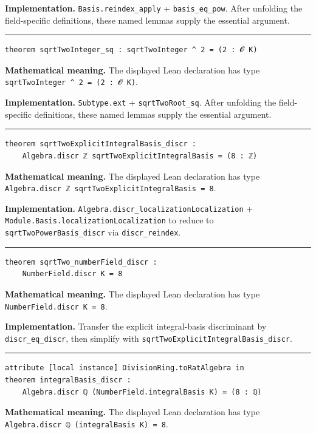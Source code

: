 \documentclass[UTF8,a4paper,11pt,fontset=fandol]{ctexart}
\theoremstyle{definition}
\newcommand{\statementsep}{\par\medskip\hrule\medskip}
\begin{document}
\noindent\textbf{Implementation.} \texttt{Basis.\allowbreak{}reindex\_\allowbreak{}apply} + \texttt{basis\_\allowbreak{}eq\_\allowbreak{}pow}. After unfolding the field-specific definitions, these named lemmas supply the essential argument.\par
\statementsep
\begin{verbatim}
theorem sqrtTwoInteger_sq : sqrtTwoInteger ^ 2 = (2 : 𝓞 K)
\end{verbatim}
\noindent\textbf{Mathematical meaning.} The displayed Lean declaration has type \texttt{sqrtTwoInteger \textasciicircum{} 2 = (2 : 𝓞 K)}.\par
\noindent\textbf{Implementation.} \texttt{Subtype.\allowbreak{}ext} + \texttt{sqrtTwoRoot\_\allowbreak{}sq}. After unfolding the field-specific definitions, these named lemmas supply the essential argument.\par
\statementsep
\begin{verbatim}
theorem sqrtTwoExplicitIntegralBasis_discr :
    Algebra.discr ℤ sqrtTwoExplicitIntegralBasis = (8 : ℤ)
\end{verbatim}
\noindent\textbf{Mathematical meaning.} The displayed Lean declaration has type \texttt{Algebra.\allowbreak{}discr ℤ sqrtTwoExplicitIntegralBasis = 8}.\par
\noindent\textbf{Implementation.} \texttt{Algebra.\allowbreak{}discr\_\allowbreak{}localizationLocalization} + \texttt{Module.\allowbreak{}Basis.\allowbreak{}localizationLocalization} to reduce to \texttt{sqrtTwoPowerBasis\_\allowbreak{}discr} via \texttt{discr\_\allowbreak{}reindex}.\par
\statementsep
\begin{verbatim}
theorem sqrtTwo_numberField_discr :
    NumberField.discr K = 8
\end{verbatim}
\noindent\textbf{Mathematical meaning.} The displayed Lean declaration has type \texttt{NumberField.\allowbreak{}discr K = 8}.\par
\noindent\textbf{Implementation.} Transfer the explicit integral-basis discriminant by \texttt{discr\_\allowbreak{}eq\_\allowbreak{}discr}, then simplify with \texttt{sqrtTwoExplicitIntegralBasis\_\allowbreak{}discr}.\par
\statementsep
\begin{verbatim}
attribute [local instance] DivisionRing.toRatAlgebra in
theorem integralBasis_discr :
    Algebra.discr ℚ (NumberField.integralBasis K) = (8 : ℚ)
\end{verbatim}
\noindent\textbf{Mathematical meaning.} The displayed Lean declaration has type \texttt{Algebra.\allowbreak{}discr ℚ (integralBasis K) = 8}.\par
\end{document}
